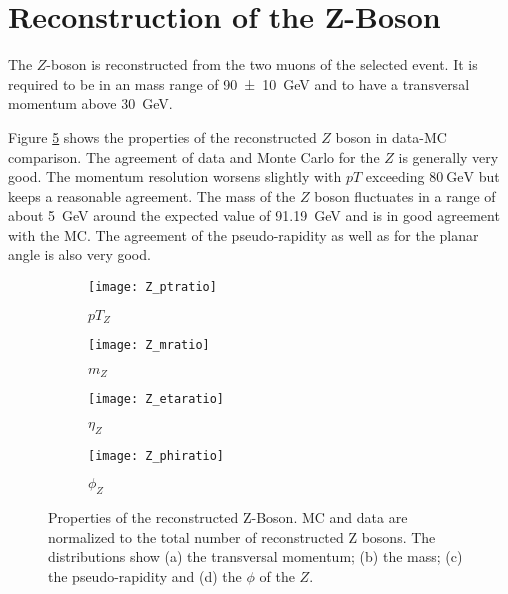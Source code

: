 \section{Reconstruction of the Z-Boson}

The $Z$-boson is reconstructed from the two muons of the selected event.
It is required to be in an mass range of \SI{90+-10}{\GeV} and to have a transversal momentum above \SI{30}{\GeV}.

Figure \ref{fig:z} shows the properties of the reconstructed $Z$ boson in data-MC comparison. The agreement of data and Monte Carlo for the $Z$ is generally very good. The momentum resolution worsens slightly with $pT$ exceeding $\SI{80}{\GeV}$ but keeps a reasonable agreement. The mass of the $Z$ boson fluctuates in a range of about \SI{5}{\GeV} around the expected value of \SI{91.19}{\GeV} and is in good agreement with the MC.
The agreement of the pseudo-rapidity as well as for the planar angle is also very good.


\begin{figure}[h]
\centering
\begin{subfigure}[b]{0.5\figwidth}
\texttt{[image: Z\_ptratio]}
\caption[Transversal momentum of the reconstructed Z]{$pT_Z$}
\label{fig:zpt}
\end{subfigure}
\quad
\begin{subfigure}[b]{0.5\figwidth}
\texttt{[image: Z\_mratio]}
\caption[mass of the reconstructed $Z$]{$m_Z$}
\label{fig:zm}
\end{subfigure}


\begin{subfigure}[b]{0.5\figwidth}
\texttt{[image: Z\_etaratio]}
\caption[$\eta$ of the reconstructed $Z$]{$\eta_Z$}
\label{fig:zeta}
\end{subfigure}
\quad
\begin{subfigure}[b]{0.5\figwidth}
\texttt{[image: Z\_phiratio]}
\caption[$\phi$ of the reconstructed $Z$]{$\phi_Z$}
\label{fig:zphi}
\end{subfigure}
\caption{Properties of the reconstructed Z-Boson. MC and data are normalized to the total number of reconstructed Z bosons. The distributions show (a) the transversal momentum; (b) the mass; (c) the pseudo-rapidity and (d) the $\phi$ of the $Z$.}
\label{fig:z}
\end{figure}


